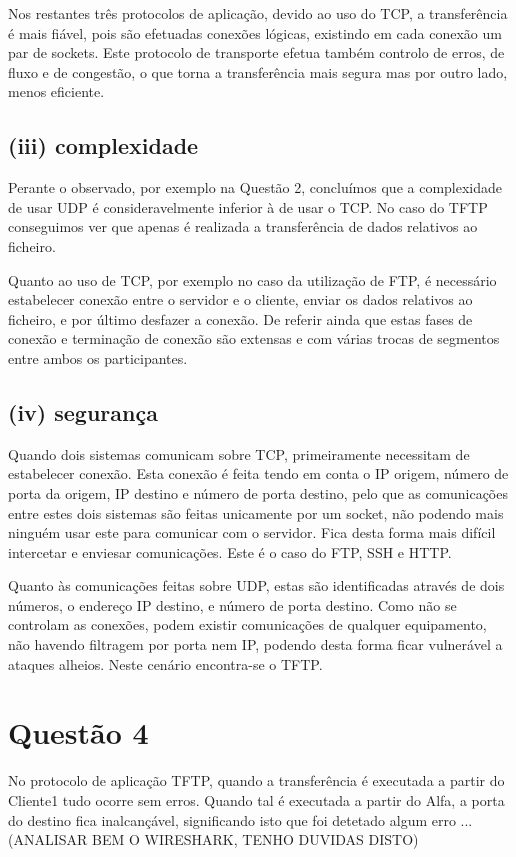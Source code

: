 \documentclass{llncs}
\begin{document}
Nos restantes três protocolos de aplicação, devido ao uso do TCP, a transferência é mais fiável, pois são efetuadas conexões lógicas, existindo em cada conexão um par de sockets. Este protocolo de transporte efetua também controlo de erros, de fluxo e de congestão, o que torna a transferência mais segura mas por outro lado, menos eficiente.

\subsection{(iii) complexidade}
Perante o observado, por exemplo na Questão 2, concluímos que a complexidade de usar UDP é consideravelmente inferior à de usar o TCP. No caso do TFTP conseguimos ver que apenas é realizada a transferência de dados relativos ao ficheiro.

Quanto ao uso de TCP, por exemplo no caso da utilização de FTP, é necessário estabelecer conexão entre o servidor e o cliente, enviar os dados relativos ao ficheiro, e por último desfazer a conexão. De referir ainda que estas fases de conexão e terminação de conexão são extensas e com várias trocas de segmentos entre ambos os participantes.

\subsection{(iv) segurança}
Quando dois sistemas comunicam sobre TCP, primeiramente necessitam de estabelecer conexão. Esta conexão é feita tendo em conta o IP origem, número de porta da origem, IP destino e número de porta destino, pelo que as comunicações entre estes dois sistemas são feitas unicamente por um socket, não podendo mais ninguém usar este para comunicar com o servidor. Fica desta forma mais difícil intercetar e enviesar comunicações. Este é o caso do FTP, SSH e HTTP.

Quanto às comunicações feitas sobre UDP, estas são identificadas através de dois números, o endereço IP destino, e número de porta destino. Como não se controlam as conexões, podem existir comunicações de qualquer equipamento, não havendo filtragem por porta nem IP, podendo desta forma ficar vulnerável a ataques alheios. Neste cenário encontra-se o TFTP.


\section{Questão 4}
No protocolo de aplicação TFTP, quando a transferência é executada a partir do Cliente1 tudo ocorre sem erros. Quando tal é executada a partir do Alfa, a porta do destino fica inalcançável, significando isto que foi detetado algum erro ... (ANALISAR BEM O WIRESHARK, TENHO DUVIDAS DISTO)
\end{document}
